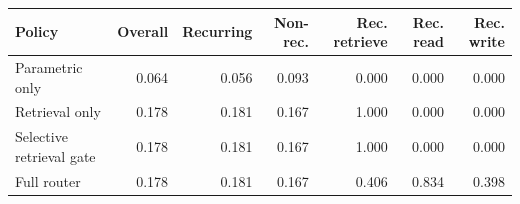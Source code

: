 \begin{tabular}{lrrrrrr}
\toprule
Policy & Overall & Recurring & Non-rec. & Rec. retrieve & Rec. read & Rec. write \\
\midrule
Parametric only & 0.064 & 0.056 & 0.093 & 0.000 & 0.000 & 0.000 \\
Retrieval only & 0.178 & 0.181 & 0.167 & 1.000 & 0.000 & 0.000 \\
Selective retrieval gate & 0.178 & 0.181 & 0.167 & 1.000 & 0.000 & 0.000 \\
Full router & 0.178 & 0.181 & 0.167 & 0.406 & 0.834 & 0.398 \\
\bottomrule
\end{tabular}
